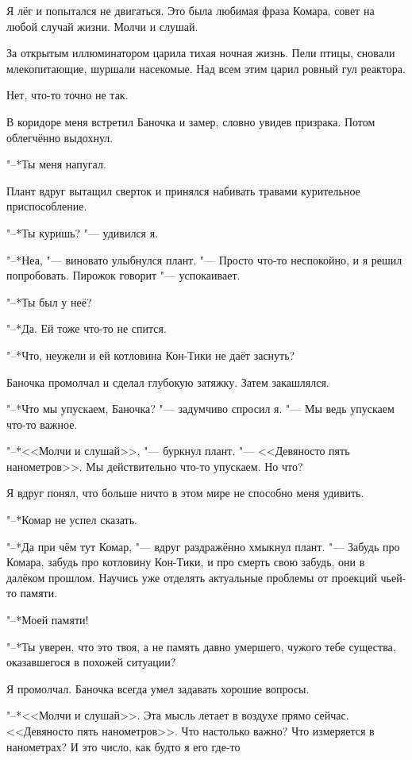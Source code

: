 Я лёг и попытался не двигаться.
Это была любимая фраза Комара, совет на любой случай жизни.
Молчи и слушай.

За открытым иллюминатором царила тихая ночная жизнь.
Пели птицы, сновали млекопитающие, шуршали насекомые.
Над всем этим царил ровный гул реактора.

Нет, что-то точно не так.

В коридоре меня встретил Баночка и замер, словно увидев призрака.
Потом облегчённо выдохнул.

"--*Ты меня напугал.

Плант вдруг вытащил сверток и принялся набивать травами курительное приспособление.

"--*Ты куришь? "--- удивился я.

"--*Неа, "--- виновато улыбнулся плант.
"--- Просто что-то неспокойно, и я решил попробовать.
Пирожок говорит "--- успокаивает.

"--*Ты был у неё?

"--*Да.
Ей тоже что-то не спится.

"--*Что, неужели и ей котловина Кон-Тики не даёт заснуть?

Баночка промолчал и сделал глубокую затяжку.
Затем закашлялся.

"--*Что мы упускаем, Баночка? "--- задумчиво спросил я.
"--- Мы ведь упускаем что-то важное.

"--*<<Молчи и слушай>>, "--- буркнул плант.
"--- <<Девяносто пять нанометров>>.
Мы действительно что-то упускаем.
Но что?

Я вдруг понял, что больше ничто в этом мире не способно меня удивить.

"--*Комар не успел сказать.

"--*Да при чём тут Комар, "--- вдруг раздражённо хмыкнул плант.
"--- Забудь про Комара, забудь про котловину Кон-Тики, и про смерть свою забудь, они в далёком прошлом.
Научись уже отделять актуальные проблемы от проекций чьей-то памяти.

"--*Моей памяти!

"--*Ты уверен, что это твоя, а не память давно умершего, чужого тебе существа, оказавшегося в похожей ситуации?

Я промолчал.
Баночка всегда умел задавать хорошие вопросы.

"--*<<Молчи и слушай>>.
Эта мысль летает в воздухе прямо сейчас.
<<Девяносто пять нанометров>>.
Что настолько важно?
Что измеряется в нанометрах?
И это число, как будто я его где-то\ldotst

